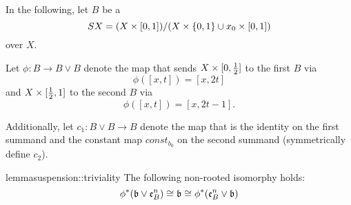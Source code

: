 \begin{myparagraph}
    In the following, let $B$ be a 
    \[ SX = (X \times{} [0, 1]) / (X \times \{0, 1\} \cup x_0 \times{} [0, 1])\]
    over $X$.

    Let $\phi: B \to B \vee B$ denote the map that sends
    $X \times [0, \frac{1}{2}]$ to the first $B$ via
    \[ \phi([x, t]) = [x, 2t] \]
    and $X \times [\frac{1}{2}, 1]$ to the second $B$ via
    \[ \phi([x, t]) = [x, 2t - 1]. \]

    Additionally, let $c_1: B \vee B \to B$ denote the map
    that is the identity on the first summand
    and the constant map $const_{b_0}$ on the second summand (symmetrically define $c_2$).
\end{myparagraph}

\begin{mystatement}{lemma}{suspension::triviality}
    The following non-rooted isomorphy holds:
    \[ \ind{\phi}(\bb \vee \be{B}) \cong \bb \cong \ind{\phi}(\be{B} \vee \bb) \]
\end{mystatement}
